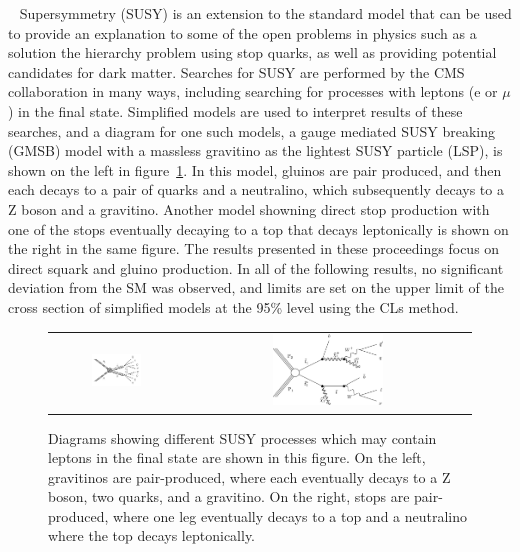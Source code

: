 ~\cite{SUSYPrimer}
Supersymmetry (SUSY) is an extension to the standard model that can be used to
provide an explanation to some of the open problems in physics such as
a solution the hierarchy problem using stop quarks,
as well as providing potential candidates for dark matter.
Searches for SUSY are performed by the CMS collaboration in many ways, including searching for processes with leptons (e or $\mu$) in the final state.
Simplified models are used to interpret results of these searches, and a diagram for one such models,
a gauge mediated SUSY breaking (GMSB) model with a massless gravitino as the lightest SUSY particle (LSP), is shown on the left in figure~\ref{fig:SMS_T5ZZgmsb}.
In this model, gluinos are pair produced, and then each decays to a pair of quarks and a neutralino,
which subsequently decays to a Z boson and a gravitino.
Another model showning direct stop production with one of the stops eventually
decaying to a top that decays leptonically is shown on the right in the same figure.
The results presented in these proceedings focus on direct squark and gluino production.
In all of the following results, no significant deviation from the SM was observed,
and limits are set on the upper limit of the cross section of simplified models at the 95\% level using the CLs method.

\begin{figure}[!htb]
  \begin{center}
    \begin{tabular}{cc}
      \includegraphics[width=0.4\textwidth]{intro/Feynman_graph_T5ZZgmsb.pdf} &
      \includegraphics[width=0.4\textwidth]{intro/T2tt.pdf}
    \end{tabular}
    \caption{
      \label{fig:SMS_T5ZZgmsb}
      Diagrams showing different SUSY processes which may contain leptons in the final state are shown in this figure.
      On the left, gravitinos are pair-produced, where each eventually decays to a Z boson, two quarks, and a gravitino.
      On the right, stops are pair-produced, where one leg eventually decays to a top and a neutralino where the top decays leptonically.
    }
  \end{center}
\end{figure}

